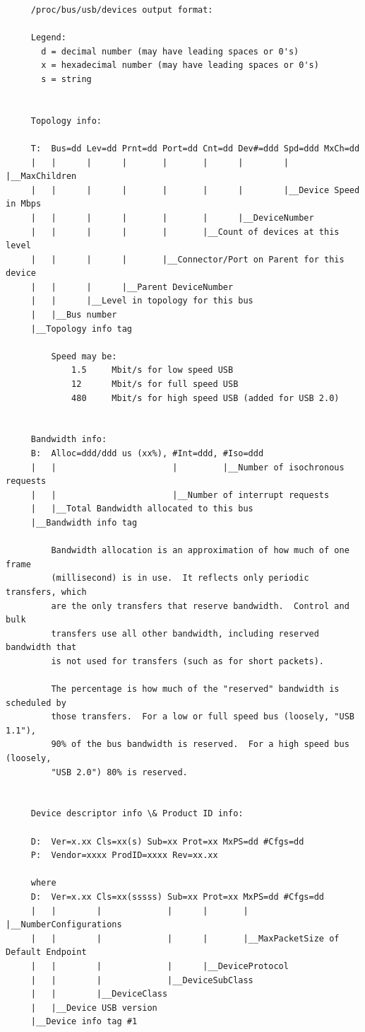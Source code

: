 \begin{verbatim}
     /proc/bus/usb/devices output format:
     
     Legend:
       d = decimal number (may have leading spaces or 0's)
       x = hexadecimal number (may have leading spaces or 0's)
       s = string
     
     
     Topology info:
     
     T:  Bus=dd Lev=dd Prnt=dd Port=dd Cnt=dd Dev#=ddd Spd=ddd MxCh=dd
     |   |      |      |       |       |      |        |       |__MaxChildren
     |   |      |      |       |       |      |        |__Device Speed in Mbps
     |   |      |      |       |       |      |__DeviceNumber
     |   |      |      |       |       |__Count of devices at this level
     |   |      |      |       |__Connector/Port on Parent for this device
     |   |      |      |__Parent DeviceNumber
     |   |      |__Level in topology for this bus
     |   |__Bus number
     |__Topology info tag
     
         Speed may be:
             1.5     Mbit/s for low speed USB
             12      Mbit/s for full speed USB
             480     Mbit/s for high speed USB (added for USB 2.0)
     
     
     Bandwidth info:
     B:  Alloc=ddd/ddd us (xx%), #Int=ddd, #Iso=ddd
     |   |                       |         |__Number of isochronous requests
     |   |                       |__Number of interrupt requests
     |   |__Total Bandwidth allocated to this bus
     |__Bandwidth info tag
     
         Bandwidth allocation is an approximation of how much of one frame
         (millisecond) is in use.  It reflects only periodic transfers, which
         are the only transfers that reserve bandwidth.  Control and bulk
         transfers use all other bandwidth, including reserved bandwidth that
         is not used for transfers (such as for short packets).
     
         The percentage is how much of the "reserved" bandwidth is scheduled by
         those transfers.  For a low or full speed bus (loosely, "USB 1.1"),
         90% of the bus bandwidth is reserved.  For a high speed bus (loosely,
         "USB 2.0") 80% is reserved.
     
     
     Device descriptor info \& Product ID info:
     
     D:  Ver=x.xx Cls=xx(s) Sub=xx Prot=xx MxPS=dd #Cfgs=dd
     P:  Vendor=xxxx ProdID=xxxx Rev=xx.xx
     
     where
     D:  Ver=x.xx Cls=xx(sssss) Sub=xx Prot=xx MxPS=dd #Cfgs=dd
     |   |        |             |      |       |       |__NumberConfigurations
     |   |        |             |      |       |__MaxPacketSize of Default Endpoint
     |   |        |             |      |__DeviceProtocol
     |   |        |             |__DeviceSubClass
     |   |        |__DeviceClass
     |   |__Device USB version
     |__Device info tag #1
     

\end{verbatim}
